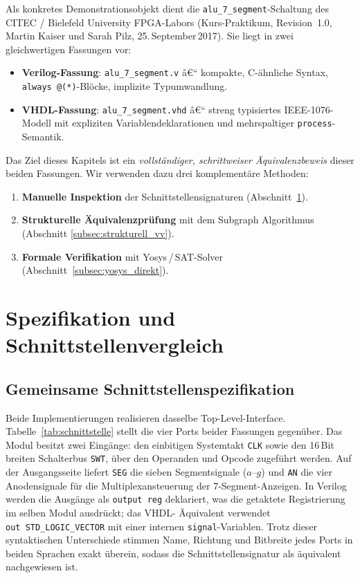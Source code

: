 ﻿\documentclass[12pt,a4paper]{report}
\begin{document}
Als konkretes Demonstrationsobjekt dient die \texttt{alu\_7\_segment}-Schaltung
des CITEC / Bielefeld University FPGA-Labors (Kurs-Praktikum, Revision~1.0,
Martin Kaiser und Sarah Pilz, 25.\,September\,2017).  Sie liegt in zwei
gleichwertigen Fassungen vor:

\begin{itemize}
	\item \textbf{Verilog-Fassung}: \texttt{alu\_7\_segment.v} â€“
	kompakte, C-ähnliche Syntax, \texttt{always\,@(*)}-Blöcke,
	implizite Typumwandlung.
	\item \textbf{VHDL-Fassung}: \texttt{alu\_7\_segment.vhd} â€“
	streng typisiertes IEEE-1076-Modell mit expliziten
	Variablendeklarationen und mehrspaltiger \texttt{process}-Semantik.
\end{itemize}

Das Ziel dieses Kapitels ist ein \emph{vollständiger, schrittweiser
	Äquivalenzbeweis} dieser beiden Fassungen.  Wir verwenden dazu drei
komplementäre Methoden:

\begin{enumerate}
	\item \textbf{Manuelle Inspektion} der Schnittstellensignaturen (Abschnitt~\ref{subsec:schnittstellenvergleich}).
	\item \textbf{Strukturelle Äquivalenzprüfung} mit dem Subgraph Algorithmus
	\cite{subgraph2026} (Abschnitt \ref{subsec:strukturell_vv}).
	\item \textbf{Formale Verifikation} mit Yosys\,/\,SAT-Solver
	(Abschnitt~\ref{subsec:yosys_direkt}).
\end{enumerate}

\section{Spezifikation und Schnittstellenvergleich}
\label{subsec:schnittstellenvergleich}

\subsection{Gemeinsame Schnittstellenspezifikation}

Beide Implementierungen realisieren dasselbe Top-Level-Interface.
Tabelle~\ref{tab:schnittstelle} stellt die vier Ports beider Fassungen gegenüber.
Das Modul besitzt zwei Eingänge: den einbitigen Systemtakt \texttt{CLK} sowie den
16\,Bit breiten Schalterbus \texttt{SWT}, über den Operanden und Opcode zugeführt
werden.  Auf der Ausgangsseite liefert \texttt{SEG} die sieben Segmentsignale
($a$--$g$) und \texttt{AN} die vier Anodensignale für die Multiplexansteuerung der
7-Segment-Anzeigen.  In Verilog werden die Ausgänge als \texttt{output~reg}
deklariert, was die getaktete Registrierung im selben Modul ausdrückt; das VHDL-
Äquivalent verwendet \texttt{out~STD\_LOGIC\_VECTOR} mit einer internen
\texttt{signal}-Variablen.  Trotz dieser syntaktischen Unterschiede stimmen Name,
Richtung und Bitbreite jedes Ports in beiden Sprachen exakt überein, sodass die
Schnittstellensignatur als äquivalent nachgewiesen ist.
\end{document}
